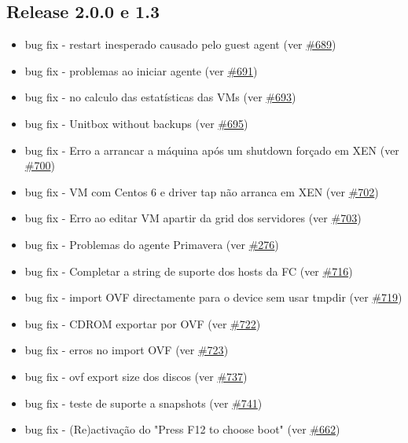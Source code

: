 \subsection{Release 2.0.0 e 1.3}
\begin{itemize}
	\item bug fix - restart inesperado causado pelo guest agent (ver \href{https://srcmaster.eurotux.com/pm/p/etva/ticket/689}{\#689})
	\item bug fix - problemas ao iniciar agente (ver \href{https://srcmaster.eurotux.com/pm/p/etva/ticket/691}{\#691})
	\item bug fix - no calculo das estatísticas das VMs (ver \href{https://srcmaster.eurotux.com/pm/p/etva/ticket/693}{\#693})
	\item bug fix - Unitbox without backups (ver \href{https://srcmaster.eurotux.com/pm/p/etva/ticket/695}{\#695})
	\item bug fix - Erro a arrancar a máquina após um shutdown forçado em XEN (ver \href{https://srcmaster.eurotux.com/pm/p/etva/ticket/700}{\#700})
	\item bug fix - VM com Centos 6 e driver tap não arranca em XEN (ver \href{https://srcmaster.eurotux.com/pm/p/etva/ticket/702}{\#702})
	\item bug fix - Erro ao editar VM apartir da grid dos servidores (ver \href{https://srcmaster.eurotux.com/pm/p/etva/ticket/703}{\#703})
	\item bug fix - Problemas do agente Primavera (ver \href{https://srcmaster.eurotux.com/pm/p/etva/ticket/276}{\#276})
	\item bug fix - Completar a string de suporte dos hosts da FC (ver \href{https://srcmaster.eurotux.com/pm/p/etva/ticket/716}{\#716})
	\item bug fix - import OVF directamente para o device sem usar tmpdir (ver \href{https://srcmaster.eurotux.com/pm/p/etva/ticket/719}{\#719})
	\item bug fix - CDROM exportar por OVF (ver \href{https://srcmaster.eurotux.com/pm/p/etva/ticket/722}{\#722})
	\item bug fix - erros no import OVF (ver \href{https://srcmaster.eurotux.com/pm/p/etva/ticket/723}{\#723})
	\item bug fix - ovf export size dos discos (ver \href{https://srcmaster.eurotux.com/pm/p/etva/ticket/737}{\#737})
	\item bug fix - teste de suporte a snapshots (ver \href{https://srcmaster.eurotux.com/pm/p/etva/ticket/741}{\#741})
	\item bug fix - (Re)activação do "Press F12 to choose boot" (ver \href{https://srcmaster.eurotux.com/pm/p/etva/ticket/662}{\#662})

\end{itemize}

